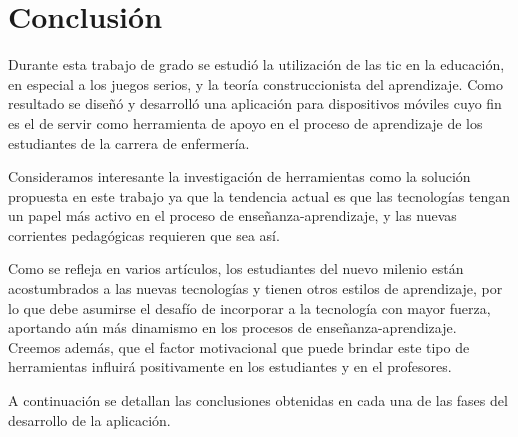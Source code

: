 \chapter{Conclusión}
\label{chap:conclusion}


Durante esta trabajo de grado se estudió la utilización de las \Gls{tic} en la
educación, en especial a los juegos serios, y la teoría construccionista del
aprendizaje. Como resultado se diseñó y desarrolló una aplicación para
dispositivos móviles cuyo fin es el de servir como herramienta de apoyo en el
proceso de aprendizaje de los estudiantes de la carrera de enfermería.

Consideramos interesante la investigación de herramientas como la solución
propuesta en este trabajo ya que la tendencia actual es que las tecnologías
tengan un papel más activo en el proceso de enseñanza-aprendizaje, y las nuevas
corrientes pedagógicas requieren que sea así. 

Como se refleja en varios artículos, los estudiantes del nuevo milenio están
acostumbrados a las nuevas tecnologías y tienen otros estilos de aprendizaje,
por lo que debe asumirse el desafío de incorporar a la tecnología con mayor
fuerza, aportando aún más dinamismo en los procesos de enseñanza-aprendizaje.
Creemos además, que el factor motivacional que puede brindar este tipo de
herramientas influirá positivamente en los estudiantes y en el profesores.

A continuación se detallan las conclusiones obtenidas en cada una de las fases del 
desarrollo de la aplicación.





